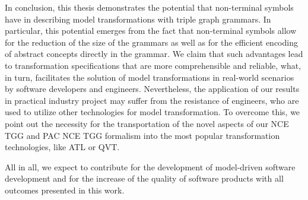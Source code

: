 In conclusion, this thesis demonstrates the potential that non-terminal symbols have in describing model transformations with triple graph grammars. In particular, this potential emerges from the fact that non-terminal symbols allow for the reduction of the size of the grammars as well as for the efficient encoding of abstract concepts directly in the grammar. We claim that such advantages lead to transformation specifications that are more comprehensible and reliable, what, in turn, facilitates the solution of model transformations in real-world scenarios by software developers and engineers. Nevertheless, the application of our results in practical industry project may suffer from the resistance of engineers, who are used to utilize other technologies for model transformation. To overcome this, we point out the necessity for the transportation of the novel aspects of our NCE TGG and PAC NCE TGG formalism into the most popular transformation technologies, like ATL or QVT.

All in all, we expect to contribute for the development of model-driven software development and for the increase of the quality of software products with all outcomes presented in this work.





